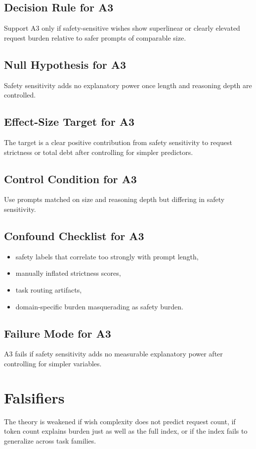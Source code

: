 \documentclass[11pt]{article}
\begin{document}
\subsection{Decision Rule for A3}
Support A3 only if safety-sensitive wishes show superlinear or clearly elevated request burden relative to safer prompts of comparable size.

\subsection{Null Hypothesis for A3}
Safety sensitivity adds no explanatory power once length and reasoning depth are controlled.

\subsection{Effect-Size Target for A3}
The target is a clear positive contribution from safety sensitivity to request strictness or total debt after controlling for simpler predictors.

\subsection{Control Condition for A3}
Use prompts matched on size and reasoning depth but differing in safety sensitivity.

\subsection{Confound Checklist for A3}
\begin{itemize}[leftmargin=*]
\item safety labels that correlate too strongly with prompt length,
\item manually inflated strictness scores,
\item task routing artifacts,
\item domain-specific burden masquerading as safety burden.
\end{itemize}

\subsection{Failure Mode for A3}
A3 fails if safety sensitivity adds no measurable explanatory power after controlling for simpler variables.

\section{Falsifiers}
The theory is weakened if wish complexity does not predict request count, if token count explains burden just as well as the full index, or if the index fails to generalize across task families.
\end{document}
